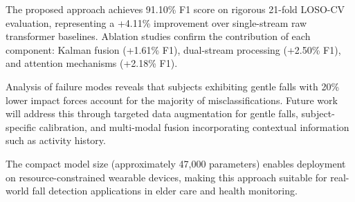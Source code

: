 \documentclass[journal,article,submit,pdftex,moreauthors]{Definitions/mdpi}
\begin{document}
The proposed approach achieves 91.10\% F1 score on rigorous 21-fold LOSO-CV evaluation, representing a +4.11\% improvement over single-stream raw transformer baselines. Ablation studies confirm the contribution of each component: Kalman fusion (+1.61\% F1), dual-stream processing (+2.50\% F1), and attention mechanisms (+2.18\% F1).

Analysis of failure modes reveals that subjects exhibiting gentle falls with 20\% lower impact forces account for the majority of misclassifications. Future work will address this through targeted data augmentation for gentle falls, subject-specific calibration, and multi-modal fusion incorporating contextual information such as activity history.

The compact model size (approximately 47,000 parameters) enables deployment on resource-constrained wearable devices, making this approach suitable for real-world fall detection applications in elder care and health monitoring.




\end{document}
